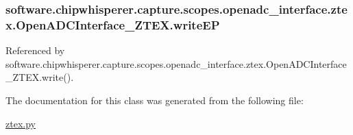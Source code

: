 \hypertarget{classsoftware_1_1chipwhisperer_1_1capture_1_1scopes_1_1openadc__interface_1_1ztex_1_1OpenADCInterface__ZTEX_ab9cb9b90282b40805ef829626c25cb76}{}
\subsubsection[{write\+E\+P}]{\setlength{\rightskip}{0pt plus 5cm}software.\+chipwhisperer.\+capture.\+scopes.\+openadc\+\_\+interface.\+ztex.\+Open\+A\+D\+C\+Interface\+\_\+\+Z\+T\+E\+X.\+write\+E\+P}\label{classsoftware_1_1chipwhisperer_1_1capture_1_1scopes_1_1openadc__interface_1_1ztex_1_1OpenADCInterface__ZTEX_ab9cb9b90282b40805ef829626c25cb76}


Referenced by software.\+chipwhisperer.\+capture.\+scopes.\+openadc\+\_\+interface.\+ztex.\+Open\+A\+D\+C\+Interface\+\_\+\+Z\+T\+E\+X.\+write().



The documentation for this class was generated from the following file\+:\begin{DoxyCompactItemize}
\item 
\hyperlink{ztex_8py}{ztex.\+py}\end{DoxyCompactItemize}
